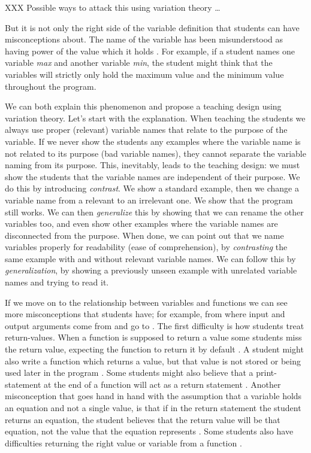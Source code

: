 XXX Possible ways to attack this using variation theory \dots

But it is not only the right side of the variable definition that students can 
have misconceptions about. The name of the variable has been misunderstood as 
having power of the value which it holds 
\parencite{MisconceptionsSurvey2017,Sleeman1984}. For example, if a student 
names one variable \emph{max} and another variable \emph{min}, the student 
might think that the variables will strictly only hold the maximum value and 
the minimum value throughout the program. 

We can both explain this phenomenon and propose a teaching design using 
variation theory.
Let's start with the explanation.
When teaching the students we always use proper (\ie relevant) variable names 
that relate to the purpose of the variable.
If we never show the students any examples where the variable name is not 
related to its purpose (bad variable names), they cannot separate the variable 
naming from its purpose.
This, inevitably, leads to the teaching design:
we must show the students that the variable names are independent of their 
purpose.
We do this by introducing \emph{contrast}.
We show a standard example, then we change a variable name from a relevant to 
an irrelevant one.
We show that the program still works.
We can then \emph{generalize} this by showing that we can rename the other 
variables too, and even show other examples where the variable names are 
disconnected from the purpose.
When done, we can point out that we name variables properly for readability 
(ease of comprehension), by \emph{contrasting} the same example with and 
without relevant variable names.
We can follow this by \emph{generalization}, by showing a previously unseen 
example with unrelated variable names and trying to read it.

If we move on to the relationship between variables and functions we can see 
more misconceptions that students have; for example, from where input and 
output arguments come from and go to \parencite{Ragonis2005OOP}.
The first difficulty is how students treat return-values. When a function is 
supposed to return a value some students miss the return value, expecting the 
function to return it by default \parencite{Kurvinen2016,KumarVeerasamy2016}.
A student might also write a function which returns a value, but that value is 
not stored or being used later in the program \parencite{AltadmriBrown2015}.
Some students might also believe that a print-statement at the end of a 
function will act as a return statement \parencite{MisconceptionsSurvey2017}. 
Another misconception that goes hand in hand with the assumption that a 
variable holds an equation and not a single value, is that if in the return 
statement the student returns an equation, the student believes that the return 
value will be that equation, not the value that the equation represents 
\parencite{Kohn2017VariableEvaluation}. Some students also have difficulties 
returning the right value or variable from a function 
\parencite{KumarVeerasamy2016}. 

